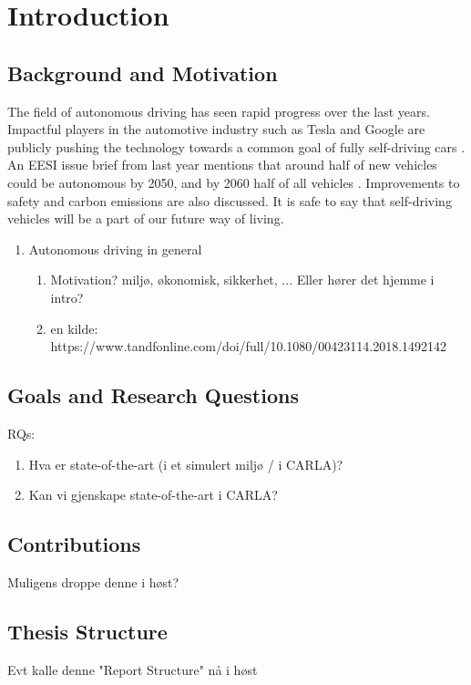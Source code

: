 \chapter{Introduction}

\section{Background and Motivation}

The field of autonomous driving has seen rapid progress over the last years. Impactful players in the automotive industry such as Tesla and Google are publicly pushing the technology towards a common goal of fully self-driving cars \cite{tesla-ai-day-2021-review, waymo-cvpr-2022}. An EESI issue brief from last year mentions that around half of new vehicles could be autonomous by 2050, and by 2060 half of all vehicles \cite{eesi-av-climate-solution}. Improvements to safety and carbon emissions are also discussed. It is safe to say that self-driving vehicles will be a part of our future way of living. 


\begin{enumerate}
    \item Autonomous driving in general
    \begin{enumerate}
        \item Motivation? miljø, økonomisk, sikkerhet, ... Eller hører det hjemme i intro?
        \item en kilde: https://www.tandfonline.com/doi/full/10.1080/00423114.2018.1492142
    \end{enumerate}
\end{enumerate}


\section{Goals and Research Questions}
RQs:
\begin{enumerate}
    \item Hva er state-of-the-art (i et simulert miljø / i CARLA)?
    \item Kan vi gjenskape state-of-the-art i CARLA?
\end{enumerate}


\section{Contributions}
Muligens droppe denne i høst?


\section{Thesis Structure}
Evt kalle denne "Report Structure" nå i høst
